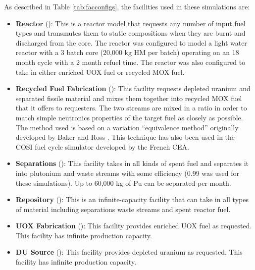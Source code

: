 As described in Table \ref{tab:facconfigs}, the facilities used in these simulations are:
\begin{itemize}

    \item \textbf{Reactor} (): This is a reactor
        model that requests any number of input fuel types and transmutes them
        to static compositions when they are burnt and discharged from the
        core. The reactor was configured to model a light water reactor
        with a 3 batch core (20,000 kg HM per batch) operating on an 18 month
        cycle with a 2 month refuel time.  The reactor was also configured to
        take in either enriched \gls{UOX} fuel or recycled \gls{MOX} fuel.

    \item \textbf{Recycled Fuel Fabrication} (): This
        facility requests depleted uranium and separated fissile material and
        mixes them together into recycled \gls{MOX} fuel that it offers to
        requesters.  The two streams are mixed in a ratio in order to match
        simple neutronics properties of the target fuel as closely as
        possible.  The method used is based on a variation ``equivalence
        method'' originally developed by Baker and Ross
        \cite{baker_comparison_1963}.  This technique has also been used in the
        \gls{COSI} fuel cycle simulator developed by the French \gls{CEA}.

    \item \textbf{Separations} (): This facility
        takes in all kinds of spent fuel and separates it into plutonium and
        waste streams with some efficiency (0.99 was used for these
        simulations).  Up to 60,000 kg of Pu can be separated per month.

    \item \textbf{Repository} (): This is an
        infinite-capacity facility that can take in all types of material
        including separations waste streams and spent reactor fuel.

    \item \textbf{UOX Fabrication} (): This facility
        provides enriched \gls{UOX} fuel as requested.  This facility has infinite
        production capacity.

    \item \textbf{DU Source} (): This facility
        provides depleted uranium as requested. This facility has infinite
        production capacity.

\end{itemize}

